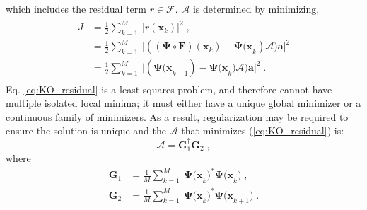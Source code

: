 \begin{itemize}
\begin{equation}
    \end{equation}
    which includes the residual term $r\in \mathcal{F}$. $\mathbf{\mathcal{A}}$ is determined by minimizing, 
    \begin{align}
    \label{eq:KO_residual}
    \begin{split}
        J &= \frac{1}{2}\sum_{k=1}^{M} ~\lvert r(\mathbf{x}_k) \rvert ^2 \;,\\
          &= \frac{1}{2}\sum_{k=1}^{M} ~\lvert ((\mathbf{\Psi \circ F})(\mathbf{x}_k) - \mathbf{\Psi(x}_{k})\mathbf{\mathcal{A}})\mathbf{a} \rvert ^2\\
          &= \frac{1}{2}\sum_{k=1}^{M} ~\lvert (\mathbf{\Psi(x}_{k+1}) - \mathbf{\Psi(x}_{k})\mathbf{\mathcal{A}})\mathbf{a} \rvert ^2 \;.
    \end{split}
    \end{align}
    Eq. \ref{eq:KO_residual} is a least squares problem, and therefore cannot have multiple isolated local minima; it must either have a unique global minimizer or a continuous family of minimizers. As a result, regularization may be required to ensure the solution is unique and the $\mathbf{\mathcal{A}}$ that minimizes (\ref{eq:KO_residual}) is:
    \begin{equation}
    \label{eq:EDMD1}
        \mathbf{\mathcal{A}} = \mathbf{G}_1^{\dagger}\mathbf{G}_2\;,
    \end{equation}
    where
    \begin{align}
    \label{eq:EDMD2}
        \mathbf{G}_1 & = \frac{1}{M}\sum_{k=1}^{M} ~\mathbf{\Psi(x}_{k})^*\mathbf{\Psi(x}_{k}) \;, \\
    \label{eq:EDMD3}
        \mathbf{G}_2 & =\frac{1}{M}\sum_{k=1}^{M} ~\mathbf{\Psi(x}_{k})^*\mathbf{\Psi(x}_{k+1})\;.

\end{align}
\end{itemize}
